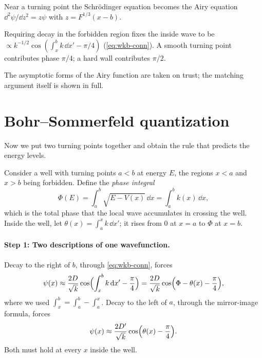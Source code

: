 \begin{keyideas}
\item Near a turning point the Schr\"odinger equation becomes the Airy equation $\dd^2\psi/\dd z^2=z\psi$ with $z=F^{1/3}(x-b)$.
\item Requiring decay in the forbidden region fixes the inside wave to be $\propto k^{-1/2}\cos(\int_x^bk\,\dd x'-\pi/4)$ (\cref{eq:wkb-conn}). A smooth turning point contributes phase $\pi/4$; a hard wall contributes $\pi/2$.
\item The asymptotic forms of the Airy function are taken on trust; the matching argument itself is shown in full.
\end{keyideas}

\section{Bohr--Sommerfeld quantization}\label{sec:wkb-bs}

Now we put two turning points together and obtain the rule that predicts the energy levels.

Consider a well with turning points $a<b$ at energy $E$, the regions $x<a$ and $x>b$ being forbidden. Define the \emph{phase integral}
\begin{equation}
\Phi(E)=\int_a^b\sqrt{E-V(x)}\,\dd x=\int_a^bk(x)\,\dd x,
\label{eq:wkb-Phi}
\end{equation}
which is the total phase that the local wave accumulates in crossing the well. Inside the well, let $\theta(x)=\int_a^xk\,\dd x'$; it rises from $0$ at $x=a$ to $\Phi$ at $x=b$.

\paragraph{Step 1: Two descriptions of one wavefunction.} Decay to the right of $b$, through \cref{eq:wkb-conn}, forces
\begin{equation}
\psi(x)\approx\frac{2D}{\sqrt k}\cos\Bigl(\int_x^bk\,\mathrm{d} x'-\frac\pi4\Bigr)=\frac{2D}{\sqrt k}\cos\Bigl(\Phi-\theta(x)-\frac\pi4\Bigr),
\end{equation}
where we used $\int_x^b=\int_a^b-\int_a^x$. Decay to the left of $a$, through the mirror-image formula, forces
\begin{equation}
\psi(x)\approx\frac{2D'}{\sqrt k}\cos\Bigl(\theta(x)-\frac\pi4\Bigr).
\end{equation}
Both must hold at every $x$ inside the well.

